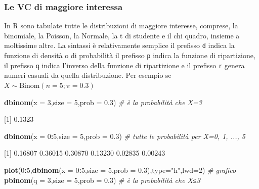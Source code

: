 \documentclass[
  11pt,
]{book}
\newenvironment{Shaded}{\begin{snugshade}}{\end{snugshade}}
\newcommand{\AttributeTok}[1]{\textcolor[rgb]{0.13,0.29,0.53}{#1}}
\newcommand{\CommentTok}[1]{\textcolor[rgb]{0.56,0.35,0.01}{\textit{#1}}}
\newcommand{\DecValTok}[1]{\textcolor[rgb]{0.00,0.00,0.81}{#1}}
\newcommand{\FloatTok}[1]{\textcolor[rgb]{0.00,0.00,0.81}{#1}}
\newcommand{\FunctionTok}[1]{\textcolor[rgb]{0.13,0.29,0.53}{\textbf{#1}}}
\newcommand{\NormalTok}[1]{#1}
\newcommand{\SpecialCharTok}[1]{\textcolor[rgb]{0.81,0.36,0.00}{\textbf{#1}}}
\newcommand{\StringTok}[1]{\textcolor[rgb]{0.31,0.60,0.02}{#1}}
\theoremstyle{mytheoremstyle}
\theoremstyle{mydefstyle}
\begin{document}
\subsubsection{Le VC di maggiore interessa}\label{le-vc-di-maggiore-interessa}

In R sono tabulate tutte le distribuzioni di maggiore interesse, comprese, la binomiale, la Poisson,
la Normale, la t di studente e il chi quadro, insieme a moltissime altre. La sintassi
è relativamente semplice il prefisso \texttt{d} indica la funzione di densità o di probabilità
il prefisso \texttt{p} indica la funzione di ripartizione, il prefisso \texttt{q} indica
l'inverso della funzione di ripartizione e il prefisso \texttt{r} genera numeri casuali
da quella distribuzione.
Per esempio se \(X\sim\text{Binom}(n=5;\pi=0.3)\)

\begin{Shaded}
\begin{Highlighting}[]
\FunctionTok{dbinom}\NormalTok{(}\AttributeTok{x =} \DecValTok{3}\NormalTok{,}\AttributeTok{size =} \DecValTok{5}\NormalTok{,}\AttributeTok{prob =} \FloatTok{0.3}\NormalTok{) }\CommentTok{\# è la probabilità che X=3}
\end{Highlighting}
\end{Shaded}

{[}1{]} 0.1323

\begin{Shaded}
\begin{Highlighting}[]
\FunctionTok{dbinom}\NormalTok{(}\AttributeTok{x =} \DecValTok{0}\SpecialCharTok{:}\DecValTok{5}\NormalTok{,}\AttributeTok{size =} \DecValTok{5}\NormalTok{,}\AttributeTok{prob =} \FloatTok{0.3}\NormalTok{) }\CommentTok{\#  tutte le probabilità per X=0, 1, ..., 5}
\end{Highlighting}
\end{Shaded}

{[}1{]} 0.16807 0.36015 0.30870 0.13230 0.02835 0.00243

\begin{Shaded}
\begin{Highlighting}[]
\FunctionTok{plot}\NormalTok{(}\DecValTok{0}\SpecialCharTok{:}\DecValTok{5}\NormalTok{,}\FunctionTok{dbinom}\NormalTok{(}\AttributeTok{x =} \DecValTok{0}\SpecialCharTok{:}\DecValTok{5}\NormalTok{,}\AttributeTok{size =} \DecValTok{5}\NormalTok{,}\AttributeTok{prob =} \FloatTok{0.3}\NormalTok{),}\AttributeTok{type=}\StringTok{"h"}\NormalTok{,}\AttributeTok{lwd=}\DecValTok{2}\NormalTok{) }\CommentTok{\# grafico}
\FunctionTok{pbinom}\NormalTok{(}\AttributeTok{q =} \DecValTok{3}\NormalTok{,}\AttributeTok{size =} \DecValTok{5}\NormalTok{,}\AttributeTok{prob =} \FloatTok{0.3}\NormalTok{) }\CommentTok{\# è la probabilità che X≤3}
\end{Highlighting}
\end{Shaded}
\end{document}
